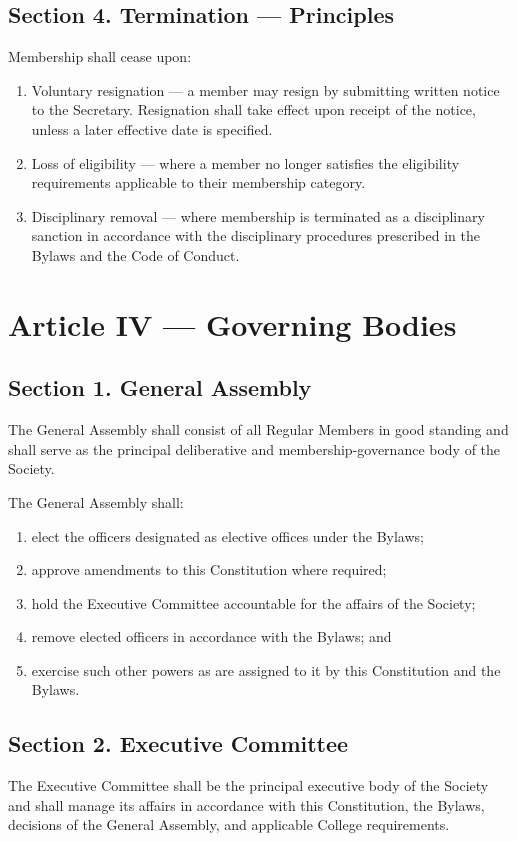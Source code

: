 \documentclass[11pt,a4paper]{article}
\begin{document}
\subsection*{Section 4. Termination --- Principles}
Membership shall cease upon:
\begin{enumerate}
    \item Voluntary resignation --- a member may resign by submitting written notice to the Secretary. Resignation shall take effect upon receipt of the notice, unless a later effective date is specified.
    \item Loss of eligibility --- where a member no longer satisfies the eligibility requirements applicable to their membership category.
    \item Disciplinary removal --- where membership is terminated as a disciplinary sanction in accordance with the disciplinary procedures prescribed in the Bylaws and the Code of Conduct.
\end{enumerate}

\section*{Article IV --- Governing Bodies}

\subsection*{Section 1. General Assembly}
The General Assembly shall consist of all Regular Members in good standing and shall
serve as the principal deliberative and membership-governance body of
the Society.

The General Assembly shall:
\begin{enumerate}[leftmargin=*]
    \item elect the officers designated as elective offices under the
    Bylaws;
    \item approve amendments to this Constitution where required;
    \item hold the Executive Committee accountable for the affairs of
    the Society;
    \item remove elected officers in accordance with the Bylaws; and
    \item exercise such other powers as are assigned to it by this
    Constitution and the Bylaws.
\end{enumerate}

\subsection*{Section 2. Executive Committee}
The Executive Committee shall be the principal executive body of the
Society and shall manage its affairs in accordance with this
Constitution, the Bylaws, decisions of the General Assembly, and
applicable College requirements.
\end{document}
